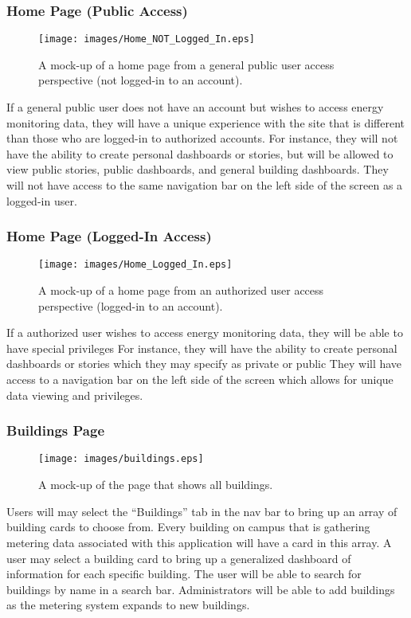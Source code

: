 \documentclass[journal,10pt,onecolumn,compsoc]{IEEEtran}
\begin{document}
	\subsubsection{Home Page (Public Access)}
    \begin{figure}[H]
        \centering
        \texttt{[image: images/Home\_NOT\_Logged\_In.eps]}
        \caption{A mock-up of a home page from a general public user access perspective (not logged-in to an account).}
    \end{figure}
	If a general public user does not have an account but wishes to access energy monitoring data, they will
	have a unique experience with the site that is different than those who are logged-in to authorized accounts. 
	For instance, they will not have the ability to create personal dashboards or stories, but will be allowed to view
	public stories, public dashboards, and general building dashboards. They will not have access to the same navigation 
	bar on the left side of the screen as a logged-in user. 
	
	\subsubsection{Home Page (Logged-In Access)}
    \begin{figure}[H]
        \centering
        \texttt{[image: images/Home\_Logged\_In.eps]}
        \caption{A mock-up of a home page from an authorized user access perspective (logged-in to an account).}
    \end{figure}
	If a authorized user wishes to access energy monitoring data, they will be able to have special privileges 
	For instance, they will have the ability to create personal dashboards or stories which they may specify as private or public
	They will have access to a navigation bar on the left side of the screen which allows for unique data viewing and privileges. 
	
	
    \subsubsection{Buildings Page} 
    \begin{figure}[H]
        \centering
        \texttt{[image: images/buildings.eps]}
        \caption{A mock-up of the page that shows all buildings.}
    \end{figure}
	Users will may select the ``Buildings'' tab in the nav bar to bring up an array of building cards to choose from.
	Every building on campus that is gathering metering data associated with this application will have a card in this array.
	A user may select a building card to bring up a generalized dashboard of information for each specific building. 
	The user will be able to search for buildings by name in a search bar. Administrators will be able to add buildings
	as the metering system expands to new buildings.
	
\end{document}
